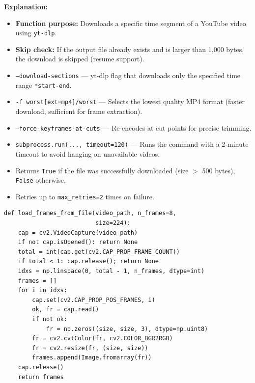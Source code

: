 \documentclass[a4paper, 12pt]{article}
\newenvironment{explanation}{%
  \par\smallskip
  \noindent\textcolor{blue!70!black}{\textbf{Explanation:}}\\
  \noindent
}{\par\medskip}
\begin{document}
\begin{explanation}
\begin{itemize}[nosep]
  \item \textbf{Function purpose:} Downloads a specific time segment of a YouTube video using \texttt{yt-dlp}.
  \item \textbf{Skip check:} If the output file already exists and is larger than 1,000 bytes, the download is skipped (resume support).
  \item \texttt{--download-sections} --- yt-dlp flag that downloads only the specified time range \texttt{*start-end}.
  \item \texttt{-f worst[ext=mp4]/worst} --- Selects the lowest quality MP4 format (faster download, sufficient for frame extraction).
  \item \texttt{--force-keyframes-at-cuts} --- Re-encodes at cut points for precise trimming.
  \item \texttt{subprocess.run(..., timeout=120)} --- Runs the command with a 2-minute timeout to avoid hanging on unavailable videos.
  \item Returns \texttt{True} if the file was successfully downloaded (size $>$ 500 bytes), \texttt{False} otherwise.
  \item Retries up to \texttt{max\_retries=2} times on failure.
\end{itemize}
\end{explanation}

\begin{lstlisting}
def load_frames_from_file(video_path, n_frames=8,
                          size=224):
    cap = cv2.VideoCapture(video_path)
    if not cap.isOpened(): return None
    total = int(cap.get(cv2.CAP_PROP_FRAME_COUNT))
    if total < 1: cap.release(); return None
    idxs = np.linspace(0, total - 1, n_frames, dtype=int)
    frames = []
    for i in idxs:
        cap.set(cv2.CAP_PROP_POS_FRAMES, i)
        ok, fr = cap.read()
        if not ok:
            fr = np.zeros((size, size, 3), dtype=np.uint8)
        fr = cv2.cvtColor(fr, cv2.COLOR_BGR2RGB)
        fr = cv2.resize(fr, (size, size))
        frames.append(Image.fromarray(fr))
    cap.release()
    return frames
\end{lstlisting}
\end{document}

